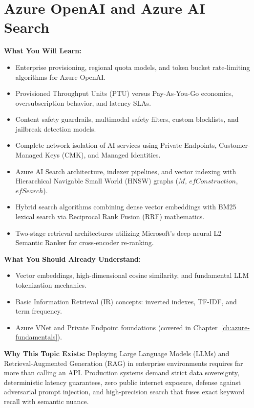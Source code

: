 \chapter{Azure OpenAI and Azure AI Search}
\label{ch:azure-openai-search}

\begin{chaptergoalsbox}
\textbf{What You Will Learn:}
\begin{itemize}[leftmargin=12pt]
  \item Enterprise provisioning, regional quota models, and token bucket rate-limiting algorithms for Azure OpenAI.
  \item Provisioned Throughput Units (PTU) versus Pay-As-You-Go economics, oversubscription behavior, and latency SLAs.
  \item Content safety guardrails, multimodal safety filters, custom blocklists, and jailbreak detection models.
  \item Complete network isolation of AI services using Private Endpoints, Customer-Managed Keys (CMK), and Managed Identities.
  \item Azure AI Search architecture, indexer pipelines, and vector indexing with Hierarchical Navigable Small World (HNSW) graphs ($M$, $efConstruction$, $efSearch$).
  \item Hybrid search algorithms combining dense vector embeddings with BM25 lexical search via Reciprocal Rank Fusion (RRF) mathematics.
  \item Two-stage retrieval architectures utilizing Microsoft's deep neural L2 Semantic Ranker for cross-encoder re-ranking.
\end{itemize}

\textbf{What You Should Already Understand:}
\begin{itemize}[leftmargin=12pt]
  \item Vector embeddings, high-dimensional cosine similarity, and fundamental LLM tokenization mechanics.
  \item Basic Information Retrieval (IR) concepts: inverted indexes, TF-IDF, and term frequency.
  \item Azure VNet and Private Endpoint foundations (covered in Chapter~\ref{ch:azure-fundamentals}).
\end{itemize}

\textbf{Why This Topic Exists:}
Deploying Large Language Models (LLMs) and Retrieval-Augmented Generation (RAG) in enterprise environments requires far more than calling an API. Production systems demand strict data sovereignty, deterministic latency guarantees, zero public internet exposure, defense against adversarial prompt injection, and high-precision search that fuses exact keyword recall with semantic nuance.


\end{chaptergoalsbox}
